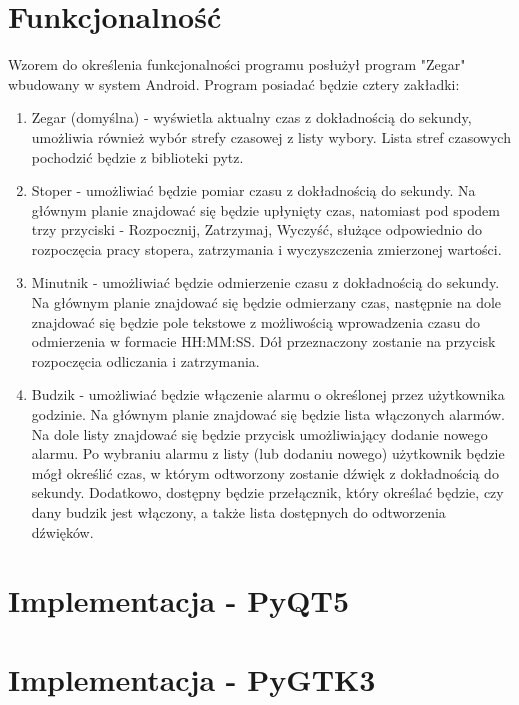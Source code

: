 \documentclass[11pt]{article}
\begin{document}
    \section{Funkcjonalność}
    Wzorem do określenia funkcjonalności programu posłużył program "Zegar" wbudowany
    w system Android.
    Program posiadać będzie cztery zakładki:
    \begin{enumerate}
        \item Zegar (domyślna) - wyświetla aktualny czas z dokładnością do sekundy,
        umożliwia również wybór strefy czasowej z listy wybory.
        Lista stref czasowych pochodzić będzie z biblioteki pytz.
        \item Stoper - umożliwiać będzie pomiar czasu z dokładnością do sekundy.
        Na głównym planie znajdować się będzie upłynięty czas, natomiast pod spodem
        trzy przyciski - Rozpocznij, Zatrzymaj, Wyczyść, służące odpowiednio do 
        rozpoczęcia pracy stopera, zatrzymania i wyczyszczenia zmierzonej wartości.
        \item Minutnik - umożliwiać będzie odmierzenie czasu z dokładnością do sekundy.
        Na głównym planie znajdować się będzie odmierzany czas, następnie na dole znajdować się
        będzie pole tekstowe z możliwością wprowadzenia czasu do odmierzenia w formacie HH:MM:SS.
        Dół przeznaczony zostanie na przycisk rozpoczęcia odliczania i zatrzymania.
        \item Budzik - umożliwiać będzie włączenie alarmu o określonej przez użytkownika godzinie.
        Na głównym planie znajdować się będzie lista włączonych alarmów. Na dole listy znajdować
        się będzie przycisk umożliwiający dodanie nowego alarmu. 
        Po wybraniu alarmu z listy (lub dodaniu nowego) użytkownik będzie mógł określić czas, w którym
        odtworzony zostanie dźwięk z dokładnością do sekundy. Dodatkowo, dostępny będzie
        przełącznik, który określać będzie, czy dany budzik jest włączony, a także lista dostępnych do
        odtworzenia dźwięków.
    \end{enumerate}

    \section{Implementacja - PyQT5}

    \section{Implementacja - PyGTK3}
\end{document}
